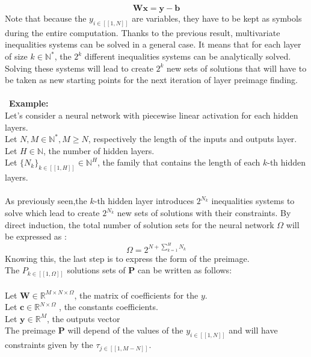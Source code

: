 \documentclass{article}
\begin{document}
\begin{equation*}
\textbf{W}\textbf{x}=\textbf{y}-\textbf{b}
\end{equation*}
Note that because the $y_{i \in [\![1,N]\!]}$ are variables, they have to be kept as symbols during the entire computation. Thanks to the previous result, 
multivariate inequalities systems can be solved in a general case. It means that for each layer of size $k \in \mathbb{N}^{*}$, the $2^{k}$ different inequalities systems 
can be analytically solved. Solving these systems will lead to create $2^{k}$ new sets of solutions that will have to be taken as new starting points for the next iteration
of layer preimage finding. 
\\\\ \
\textbf{Example: }\\
Let's consider a neural network with piecewise linear activation for each hidden layers.\\
Let $N,M \in \mathbb{N^{*}},M \geqslant N$, respectively the length of the inputs and outputs layer.\\
Let $H \in \mathbb{N}$, the number of hidden layers. \\
Let $\{N_{k}\}_{k \in [\![1,H]\!]}\in \mathbb{N}^{H}$, the family that contains the length of each $k$-th hidden layers.\\\\
As previously seen,the $k$-th hidden layer introduces $2^{N_{k}}$ inequalities systems to solve which lead to create $2^{N_{k}}$ new sets of solutions with their constraints. 
By direct induction, the total number of solution sets for the neural network $\Omega$ will be expressed as :  
\begin{equation*}
\Omega=2^{N+\sum_{k=1}^{H} N_{k}}
\end{equation*}
Knowing this, the last step is to express the form of the preimage.\\
The $P_{k \in [\![1,\Omega]\!]}$ solutions sets of $\textbf{P}$  can be written as follows:\\\\
Let $\textbf{W}\in \mathbb{R}^{M \times N \times \Omega}$, the matrix of coefficients for the $y$.\\
Let $\textbf{c} \in \mathbb{R}^{N \times \Omega}$ , the constants coefficients.\\
Let $\textbf{y} \in \mathbb{R}^{M}$, the outputs vector\\
The preimage $\textbf{P}$ will depend of the values of the $y_{i \in [\![1,N]\!]}$ and will have constraints given by the $\tau_{j \in [\![1,M-N]\!]}$.\\
\end{document}
